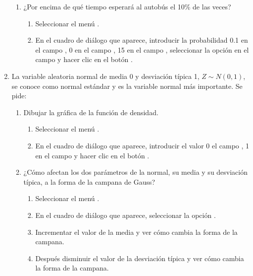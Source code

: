 \begin{enumerate}[leftmargin=*]
\begin{enumerate}
\item ¿Por encima de qué tiempo esperará al autobús el 10\% de las veces?
\begin{indicacion}{
\begin{enumerate}
\item Seleccionar el menú .
\item En el cuadro de diálogo que aparece, introducir la probabilidad 0.1 en el campo ,
0 en el campo , 15 en el campo , seleccionar la opción  en el campo
 y hacer clic en el botón .
\end{enumerate}}
\end{indicacion}
\end{enumerate}

\item La variable aleatoria normal de media 0 y desviación típica 1, $Z\sim N(0,1)$, se conoce como normal estándar y es
la variable normal más importante. 
Se pide:
\begin{enumerate}
\item Dibujar la gráfica de la función de densidad. 
\begin{indicacion}{
\begin{enumerate}
\item Seleccionar el menú .
\item En el cuadro de diálogo que aparece, introducir el valor 0 el campo , 1 en el campo  y hacer clic en el botón .
\end{enumerate}}
\end{indicacion}

\item ¿Cómo afectan los dos parámetros de la normal, su media y su desviación típica, a la forma de la campana de Gauss?
\begin{indicacion}{
\begin{enumerate}
\item Seleccionar el menú .
\item En el cuadro de diálogo que aparece, seleccionar la opción .
\item Incrementar el valor de la media y ver cómo cambia la forma de la campana.
\item Después disminuir el valor de la desviación típica y ver cómo cambia la forma de la campana.
\end{enumerate}}
\end{indicacion}


\end{enumerate}
\end{enumerate}
